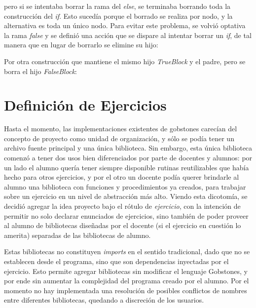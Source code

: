 
pero si se intentaba borrar la rama del \textit{else}, se terminaba borrando toda la construcción del \textit{if}. Esto sucedía porque el borrado se realiza por nodo, y la alternativa es toda un único nodo. Para evitar este problema, se volvió optativa la rama \textit{false} y se definió una acción que se dispare al intentar borrar un \textit{if}, de tal manera que en lugar de borrarlo se elimine su hijo: 

\centertree{
  [IfElseStatement
    [TrueBlock]
    [FalseBlock]
  ]
}

\bigskip

Por otra construcción que mantiene el mismo hijo \textit{TrueBlock} y el padre, pero se borra el hijo \textit{FalseBlock}:

\centertree{
  [IfElseStatement
    [TrueBlock]
    [empty]
  ]
}

\bigskip

\section{Definición de Ejercicios}\label{proyecto}

Hasta el momento, las implementaciones existentes de gobstones carecían del concepto de proyecto como unidad de organización, y sólo se podía tener un archivo fuente principal y una única biblioteca. Sin embargo, esta única biblioteca comenzó a tener dos usos bien diferenciados por parte de docentes y alumnos: por un lado el alumno quería tener siempre disponible rutinas reutilizables que había hecho para otros ejercicios, y por el otro un docente podía querer brindarle al alumno una biblioteca con funciones y procedimientos ya creados, para trabajar sobre un ejercicio en un nivel de abstracción más alto.
Viendo esta dicotomía, se decidió agregar la idea proyecto bajo el rótulo de \emph{ejercicio}, con la intención de permitir no solo declarar enunciados de ejercicios, sino también de poder proveer al alumno de bibliotecas diseñadas por el docente (si el ejercicio en cuestión lo amerita) separadas de las bibliotecas de alumno.

Estas bibliotecas no constituyen \textit{imports} en el sentido tradicional, dado que no se establecen desde el programa, sino que son dependencias inyectadas por el ejercicio. Esto permite agregar bibliotecas sin modificar el lenguaje Gobstones, y por ende sin aumentar la complejidad del programa creado por el alumno. Por el momento no hay implementada una resolución de posibles conflictos de nombres entre diferentes bibliotecas, quedando a discreción de los usuarios.

